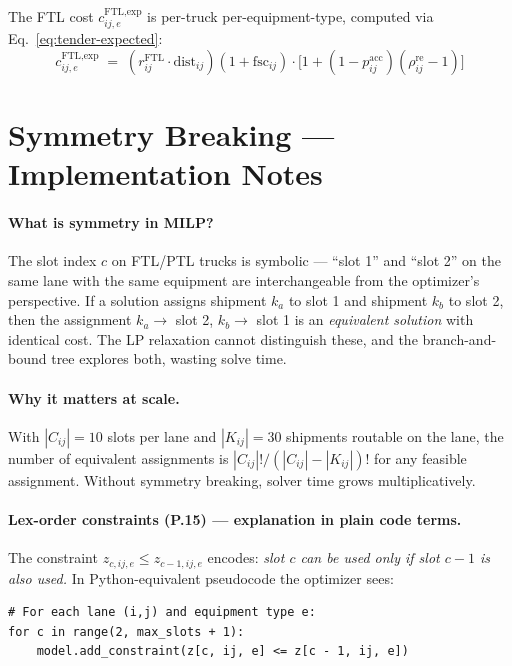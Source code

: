 \documentclass[11pt,a4paper]{article}
\theoremstyle{definition}
\begin{document}
The FTL cost $c_{ij,e}^{\text{FTL,exp}}$ is per-truck per-equipment-type, computed via
Eq.~\eqref{eq:tender-expected}:
\[
  c_{ij,e}^{\text{FTL,exp}} \;=\; (r_{ij}^{\text{FTL}} \cdot \text{dist}_{ij})(1 + \text{fsc}_{ij}) \cdot
                                  \bigl[1 + (1 - p_{ij}^{\text{acc}})(\rho_{ij}^{\text{re}} - 1)\bigr]
\]

\section{Symmetry Breaking — Implementation Notes}
\label{sec:symmetry-impl}

\paragraph{What is symmetry in MILP?}
The slot index $c$ on FTL/PTL trucks is symbolic --- ``slot 1'' and ``slot 2'' on the same
lane with the same equipment are interchangeable from the optimizer's perspective. If a
solution assigns shipment $k_a$ to slot 1 and shipment $k_b$ to slot 2, then the assignment
$k_a \to $ slot 2, $k_b \to $ slot 1 is an \emph{equivalent solution} with identical cost.
The LP relaxation cannot distinguish these, and the branch-and-bound tree explores both,
wasting solve time.

\paragraph{Why it matters at scale.}
With $|C_{ij}| = 10$ slots per lane and $|K_{ij}| = 30$ shipments routable on the lane, the
number of equivalent assignments is $|C_{ij}|! / (|C_{ij}| - |K_{ij}|)!$ for any feasible
assignment. Without symmetry breaking, solver time grows multiplicatively.

\paragraph{Lex-order constraints (P.15) — explanation in plain code terms.}

The constraint $z_{c,ij,e} \leq z_{c-1,ij,e}$ encodes: \emph{slot $c$ can be used only if
slot $c-1$ is also used.} In Python-equivalent pseudocode the optimizer sees:

\begin{verbatim}
# For each lane (i,j) and equipment type e:
for c in range(2, max_slots + 1):
    model.add_constraint(z[c, ij, e] <= z[c - 1, ij, e])
\end{verbatim}
\end{document}
